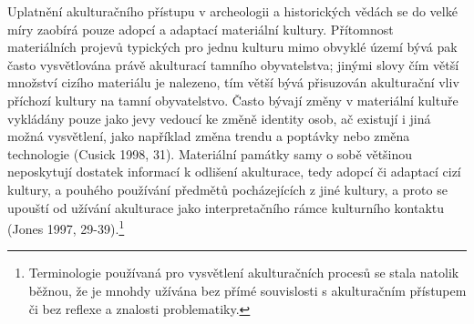 Uplatnění akulturačního přístupu v archeologii a historických vědách se do velké míry zaobírá pouze adopcí a adaptací materiální kultury. Přítomnost materiálních projevů typických pro jednu kulturu mimo obvyklé území bývá pak často vysvětlována právě akulturací tamního obyvatelstva; jinými slovy čím větší množství cizího materiálu je nalezeno, tím větší bývá přisuzován akulturační vliv příchozí kultury na tamní obyvatelstvo. Často bývají změny v materiální kultuře vykládány pouze jako jevy vedoucí ke změně identity osob, ač existují i jiná možná vysvětlení, jako například změna trendu a poptávky nebo změna technologie (Cusick 1998, 31). Materiální památky samy o sobě většinou neposkytují dostatek informací k odlišení akulturace, tedy adopcí či adaptací cizí kultury, a pouhého používání předmětů pocházejících z jiné kultury, a proto se upouští od užívání akulturace jako interpretačního rámce kulturního kontaktu (Jones 1997, 29-39).\footnote{Terminologie používaná pro vysvětlení akulturačních procesů se stala natolik běžnou, že je mnohdy užívána bez přímé souvislosti s akulturačním přístupem či bez reflexe a znalosti problematiky.}

